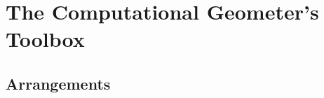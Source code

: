 \renewcommand{\parthook}{%
\AddToShipoutPictureBG*{%
\AtPageLowerLeft{\texttt{[image: figures/geometry]}}}%
\renewcommand{\parthook}{}}%
\part{The Computational Geometer's Toolbox}\label{sec:preliminaries}


\chapter{Arrangements}











